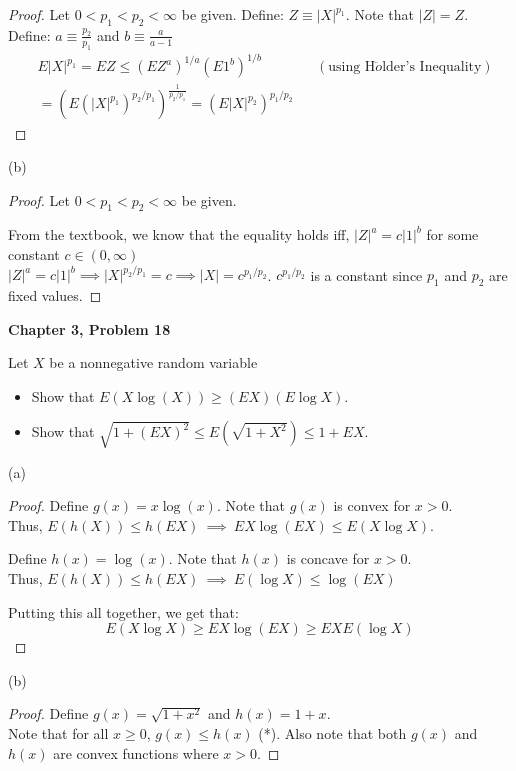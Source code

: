 \documentclass[12pt,letterpaper, onecolumn]{exam}
\begin{document}
\begin{questions}
\begin{solution}
        \begin{proof}
        Let $0 < p_1 < p_2 < \infty$ be given. 
        Define: $Z \equiv |X|^{p_1}$. Note that $|Z| = Z$. \\
        Define: $a \equiv \frac{p_2}{p_1}$ and $b \equiv \frac{a}{a - 1}$
        \begin{align*}
            & E|X|^{p_1} = E Z \leq (EZ^a)^{1/a} (E 1^b)^{1/b} && (\textrm{using H$\ddot{o}$lder's Inequality}) \\
            & = (E(|X|^{p_1})^{p_2/p_1})^{\frac{1}{p_2/p_1}} = (E|X|^{p_2})^{p_1/p_2}
        \end{align*}
        \end{proof}
        (b)
        \begin{proof}
        Let $0 < p_1 < p_2 < \infty$ be given. 
        
        From the textbook, we know that the equality holds iff, $|Z|^a = c |1|^b$ for some constant $c \in (0, \infty)$ \\
        $|Z|^a = c |1|^b \implies |X|^{p_2 / p_1} = c \implies |X| = c^{p_1 / p_2}$. $c^{p_1/p_2}$ is a constant since $p_1$ and $p_2$ are fixed values.
        \end{proof}
    \end{solution}

    \question \textbf{Chapter 3, Problem 18}

    Let $X$ be a nonnegative random variable
    \begin{itemize}
        \item[(a)] Show that $E(X\log(X)) \geq (EX)(E\log X).$
        \item[(b)] Show that $\sqrt{1 + (EX)^2} \leq E(\sqrt{1 + X^2}) \leq 1 + EX$. 
    \end{itemize} 
    \begin{solution}
    (a)
    \begin{proof}
        Define $g(x) = x \log(x)$. Note that $g(x)$ is convex for $x > 0$. \\ Thus,
        $E(h(X)) \leq h(EX) \: \implies \: EX \log(EX) \leq E(X \log X)$.

        Define $h(x) = \log(x)$. Note that $h(x)$ is concave for $x > 0$. \\
        Thus, $E(h(X)) \leq h(EX) \: \implies \: E(\log X) \leq \log(EX)$

        Putting this all together, we get that: 
        \[E(X\log X) \geq EX \log(EX) \geq EX E(\log X)\]
    \end{proof}
    (b) 
    \begin{proof}
    Define $g(x) = \sqrt{1 + x^2}$ and $h(x) = 1 + x$. \\
    Note that for all $x \geq 0$, $g(x) \leq h(x)$ (*). Also note that both $g(x)$ and $h(x)$ are convex functions where $x > 0$. 


\end{proof}
\end{solution}
\end{questions}
\end{document}

